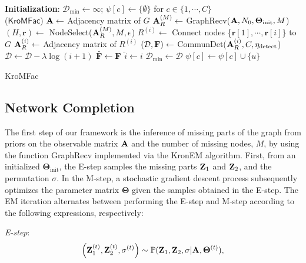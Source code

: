 \documentclass[format=acmsmall, review=false, screen=true]{acmart}
\def \log{\operatorname{log}}
\begin{document}
\begin{algorithm}[t]
\DontPrintSemicolon
{}
\KwOut{$\psi$}
\textbf{Initialization}: $ \mathcal{D}_{\min}\leftarrow \infty$; ${\psi}[c] \leftarrow \{\emptyset\}$ for $c \in \{1,\cdots,C\}$\\
\Begin($\textsf{KroMFac}$)
{
  ${\bf A} \leftarrow$ Adjacency matrix of $G$\;
  ${\bf A}^{(M)}_R \leftarrow$ \textsf{GraphRecv}(${\bf A},N_0,\bm{\Theta}_{\text{init}},M$)\;
  $(H,{\bm r}) \leftarrow$ \textsf{NodeSelect}(${\bf A}^{(M)}_R,M,\epsilon$)\;
  {
  $R^{(i)} \leftarrow$ Connect nodes \{${\bm r}[1],\cdots,{\bm r}[i]$\} to $G$\;
    ${\bf A}^{(i)}_R \leftarrow$ Adjacency matrix of $R^{(i)}$\;
    $(\mathcal{D},{\bf F}) \leftarrow$ \textsf{CommunDet}(${\bf A}^{(i)}_R, C, \eta_{\text{detect}}$)\;
    $\mathcal{D} \leftarrow \mathcal{D} - \lambda\log(i+1)$\;
    {
      $\hat{{\bf F}} \leftarrow {\bf F}$\;
      $\hat{i} \leftarrow i$\;
      $\mathcal{D}_{\min} \leftarrow \mathcal{D}$\;
      }
  }
  {
  	 {
		 {
			${\psi}[c] \leftarrow {\psi}[c] \cup \{u\} $\;
		}
	}
  }
  \Return{${\psi}$}
}
\caption{\textsf{KroMFac}}\label{al1}

\end{algorithm}

\subsection{Network Completion}\label{graphrecv}
The first step of our framework is the inference of missing parts of the graph from priors on the observable matrix ${\bf A}$ and the number of missing nodes, $M$, by using the function \textsf{GraphRecv} implemented via the KronEM algorithm. First, from an initialized $\bm{\Theta}_{\text{init}}$, the E-step samples the missing parts ${\bf Z}_1$ and ${\bf Z}_2$, and the permutation $\sigma$. In the M-step, a stochastic gradient descent process subsequently optimizes the parameter matrix $\bm{\Theta}$ given the samples obtained in the E-step. The EM iteration alternates between performing the E-step and M-step according to the following expressions, respectively:

\textit{E-step}:
\begin{equation*}
\left({\bf Z}_1^{(t)},{\bf Z}_2^{(t)},\sigma^{(t)}\right) \sim \mathbb{P}({\bf Z}_1,{\bf Z}_2,\sigma|{\bf A}, \bm{\Theta}^{(t)}),
\end{equation*}
\end{document}
